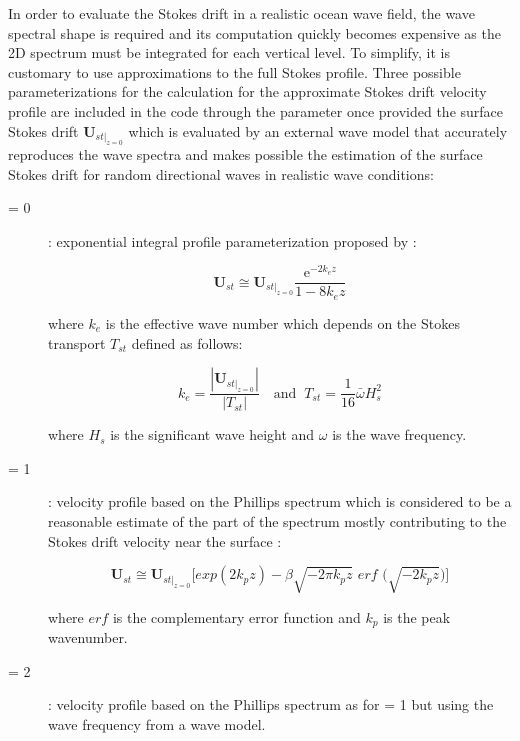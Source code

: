 \documentclass[../main/NEMO_manual]{subfiles}
\begin{document}
In order to evaluate the Stokes drift in a realistic ocean wave field, the wave spectral shape is required
and its computation quickly becomes expensive as the 2D spectrum must be integrated for each vertical level.
To simplify, it is customary to use approximations to the full Stokes profile.
Three possible parameterizations for the calculation for the approximate Stokes drift velocity profile
are included in the code through the  parameter once provided the surface Stokes drift
$\mathbf{U}_{st |_{z=0}}$ which is evaluated by an external wave model that accurately reproduces the wave spectra
and makes possible the estimation of the surface Stokes drift for random directional waves in
realistic wave conditions:

\begin{description}
\item [{ = 0}]: exponential integral profile parameterization proposed by
\citet{breivik.janssen.ea_JPO14}:

\[
  \mathbf{U}_{st} \cong \mathbf{U}_{st |_{z=0}} \frac{\mathrm{e}^{-2k_ez}} {1-8k_ez}
\]

where $k_e$ is the effective wave number which depends on the Stokes transport $T_{st}$ defined as follows:

\[
  k_e = \frac{|\mathbf{U}_{\left.st\right|_{z=0}}|} {|T_{st}|}
  \quad \text{and }\
  T_{st} = \frac{1}{16} \bar{\omega} H_s^2
\]

where $H_s$ is the significant wave height and $\omega$ is the wave frequency.

\item [{ = 1}]: velocity profile based on the Phillips spectrum which is considered to be a
reasonable estimate of the part of the spectrum mostly contributing to the Stokes drift velocity near the surface
\citep{breivik.bidlot.ea_OM16}:

\[
  \mathbf{U}_{st} \cong \mathbf{U}_{st |_{z=0}} \Big[exp(2k_pz)-\beta \sqrt{-2 \pi k_pz}
  \textit{ erf } \Big(\sqrt{-2 k_pz}\Big)\Big]
\]

where $erf$ is the complementary error function and $k_p$ is the peak wavenumber.

\item [{ = 2}]: velocity profile based on the Phillips spectrum as for  = 1
but using the wave frequency from a wave model.

\end{description}
\end{document}
